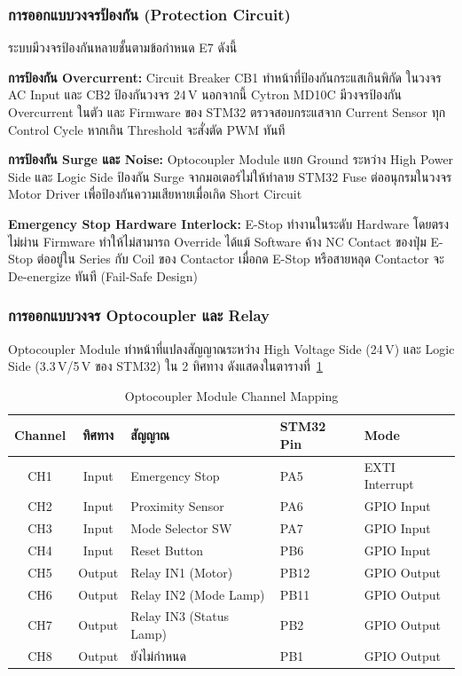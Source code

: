 \subsubsection{การออกแบบวงจรป้องกัน (Protection Circuit)}
\label{subsubsec:protection_circuit}

ระบบมีวงจรป้องกันหลายชั้นตามข้อกำหนด E7 ดังนี้

\textbf{การป้องกัน Overcurrent:}
Circuit Breaker CB1 ทำหน้าที่ป้องกันกระแสเกินพิกัด
ในวงจร AC Input และ CB2 ป้องกันวงจร 24\,V
นอกจากนี้ Cytron MD10C มีวงจรป้องกัน Overcurrent ในตัว
และ Firmware ของ STM32 ตรวจสอบกระแสจาก Current Sensor
ทุก Control Cycle หากเกิน Threshold จะสั่งตัด PWM ทันที

\textbf{การป้องกัน Surge และ Noise:}
Optocoupler Module แยก Ground ระหว่าง High Power Side
และ Logic Side ป้องกัน Surge จากมอเตอร์ไม่ให้ทำลาย STM32
Fuse ต่ออนุกรมในวงจร Motor Driver
เพื่อป้องกันความเสียหายเมื่อเกิด Short Circuit

\textbf{Emergency Stop Hardware Interlock:}
E-Stop ทำงานในระดับ Hardware โดยตรง
ไม่ผ่าน Firmware ทำให้ไม่สามารถ Override ได้แม้ Software ค้าง
NC Contact ของปุ่ม E-Stop ต่ออยู่ใน Series กับ Coil ของ Contactor
เมื่อกด E-Stop หรือสายหลุด Contactor จะ De-energize ทันที
(Fail-Safe Design)

\subsubsection{การออกแบบวงจร Optocoupler และ Relay}
\label{subsubsec:optocoupler_relay_design}

Optocoupler Module ทำหน้าที่แปลงสัญญาณระหว่าง
High Voltage Side (24\,V) และ Logic Side (3.3\,V/5\,V ของ STM32)
ใน 2 ทิศทาง ดังแสดงในตารางที่~\ref{tab:opto_mapping}

\begin{table}[H]
  \centering
  \caption{Optocoupler Module Channel Mapping}
  \label{tab:opto_mapping}
  \begin{tabular}{cclll}
    \toprule
    Channel & ทิศทาง & สัญญาณ & STM32 Pin & Mode \\
    \midrule
    CH1 & Input  & Emergency Stop      & PA5  & EXTI Interrupt \\
    CH2 & Input  & Proximity Sensor    & PA6  & GPIO Input \\
    CH3 & Input  & Mode Selector SW    & PA7  & GPIO Input \\
    CH4 & Input  & Reset Button        & PB6  & GPIO Input \\
    CH5 & Output & Relay IN1 (Motor)   & PB12 & GPIO Output \\
    CH6 & Output & Relay IN2 (Mode Lamp) & PB11 & GPIO Output \\
    CH7 & Output & Relay IN3 (Status Lamp) & PB2 & GPIO Output \\
    CH8 & Output & ยังไม่กำหนด        & PB1  & GPIO Output \\
    \bottomrule
  \end{tabular}
\end{table}

